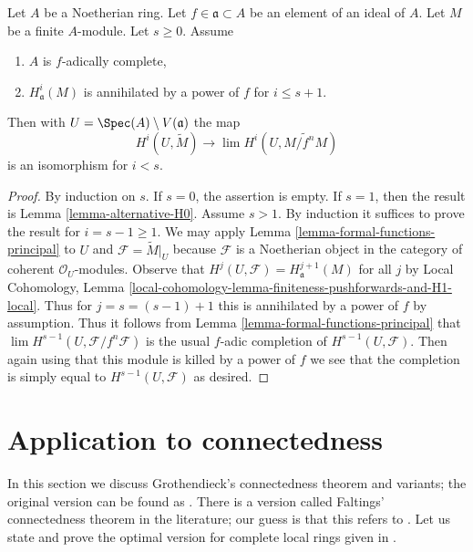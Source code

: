 \begin{lemma}
\label{lemma-alternative-higher}
Let $A$ be a Noetherian ring. Let $f \in \mathfrak a \subset A$
be an element of an ideal of $A$. Let $M$ be a finite $A$-module.
Let $s \geq 0$. Assume
\begin{enumerate}
\item $A$ is $f$-adically complete,
\item $H^i_\mathfrak a(M)$ is annihilated by a power of $f$
for $i \leq s + 1$.
\end{enumerate}
Then with $U = \Spec(A) \setminus V(\mathfrak a)$ the map
$$
H^i(U, \widetilde{M})
\longrightarrow
\lim H^i(U, \widetilde{M/f^nM})
$$
is an isomorphism for $i < s$.
\end{lemma}

\begin{proof}
By induction on $s$. If $s = 0$, the assertion is empty. If $s = 1$, then
the result is Lemma \ref{lemma-alternative-H0}. Assume $s > 1$. By induction
it suffices to prove the result for $i = s - 1 \geq 1$.
We may apply Lemma \ref{lemma-formal-functions-principal}
to $U$ and $\mathcal{F} = \widetilde{M}|_U$
because $\mathcal{F}$ is a Noetherian object in
the category of coherent $\mathcal{O}_U$-modules.
Observe that $H^j(U, \mathcal{F}) = H^{j + 1}_\mathfrak a(M)$ for all $j$ by
Local Cohomology, Lemma
\ref{local-cohomology-lemma-finiteness-pushforwards-and-H1-local}.
Thus for $j = s = (s - 1) + 1$ this is
annihilated by a power of $f$ by assumption.
Thus it follows from
Lemma \ref{lemma-formal-functions-principal} that
$\lim H^{s - 1}(U, \mathcal{F}/f^n\mathcal{F})$
is the usual $f$-adic completion of $H^{s - 1}(U, \mathcal{F})$.
Then again using that this module is killed by a power of
$f$ we see that the completion is simply equal to $H^{s - 1}(U, \mathcal{F})$
as desired.
\end{proof}





\section{Application to connectedness}
\label{section-connected}

\noindent
In this section we discuss Grothendieck's connectedness theorem
and variants; the original version can be found as
\cite[Exposee XIII, Theorem 2.1]{SGA2}. There is a version
called Faltings' connectedness theorem in the literature;
our guess is that this refers to \cite[Theorem 6]{Faltings-some}.
Let us state and prove the optimal version for complete
local rings given in \cite[Theorem 1.6]{Varbaro}.

